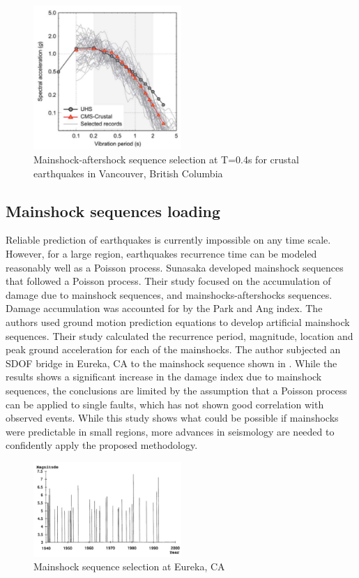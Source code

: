 \begin{figure}[htbp]
\centering
\includegraphics[width=0.5\textwidth]{Chapter-2/figs/CMS-Tesfamariam_MS-AS_seq}
\caption{Mainshock-aftershock sequence selection at T=0.4s for crustal earthquakes in Vancouver, British Columbia \cite{Tesfamariam2015}}
\label{fig:MS-AS_Goda}
\end{figure}

\subsection{Mainshock sequences loading}

Reliable prediction of earthquakes is currently impossible on any time scale.  However, for a large region, earthquakes recurrence time can be modeled reasonably well as a Poisson process. Sunasaka \cite{Sunasaka1993} developed mainshock sequences that followed a Poisson process. Their study focused on the accumulation of damage due to mainshock sequences, and mainshocks-aftershocks sequences. Damage accumulation was accounted for by the Park and Ang index. The authors used ground motion prediction equations to develop artificial mainshock sequences. Their study calculated the recurrence period, magnitude, location and peak ground acceleration for each of the mainshocks. The author subjected an SDOF bridge in Eureka, CA to the mainshock sequence shown in   . While the results shows a significant increase in the damage index due to mainshock sequences, the conclusions are limited by the assumption that a Poisson process can be applied to single faults, which has not shown good correlation with observed events\cite{Shearer2009}. While this study shows what could be possible if mainshocks were predictable in small regions, more advances in seismology are needed to confidently apply the proposed methodology.

\begin{figure}[htbp]
\centering
\includegraphics[width=0.5\textwidth]{Chapter-2/figs/Mainshock_sequence_01}
\caption{Mainshock sequence selection at Eureka, CA \cite{Sunasaka1993}}
\label{fig:MS-MS_Sunasaka}
\end{figure}

